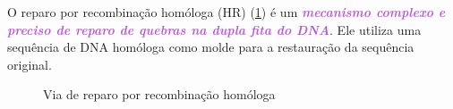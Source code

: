 \documentclass[11pt,a4paper]{article}
\begin{document}
	O reparo por recombinação homóloga (HR) (\ref{fig:recombinacaoHomologa}) é um \textcolor{MediumOrchid}{\textbf{\textit{mecanismo complexo e preciso de reparo de quebras na dupla fita do DNA}}}. Ele utiliza uma sequência de DNA homóloga como molde para a restauração da sequência original.

	\begin{figure}
		\centering
		\caption{Via de reparo por recombinação homóloga}
		\label{fig:recombinacaoHomologa}
	\end{figure}
\end{document}

